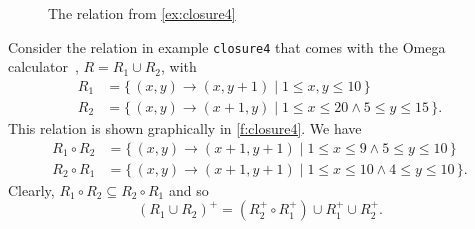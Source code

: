 \begin{figure}
\begin{center}
\end{center}
\caption{The relation from \autoref{ex:closure4}}
\label{f:closure4}
\end{figure}
\begin{example}
\label{ex:closure4}
Consider the relation in example {\tt closure4} that comes with
the Omega calculator~\parencite{Omega_calc}, $R = R_1 \cup R_2$,
with
$$
\begin{aligned}
R_1 & = \{\, (x,y) \to (x,y+1) \mid 1 \le x,y \le 10 \,\}
\\
R_2 & = \{\, (x,y) \to (x+1,y) \mid 1 \le x \le 20 \wedge 5 \le y \le 15 \,\}
.
\end{aligned}
$$
This relation is shown graphically in \autoref{f:closure4}.
We have
$$
\begin{aligned}
R_1 \circ R_2 &=
\{\, (x,y) \to (x+1,y+1) \mid 1 \le x \le 9 \wedge 5 \le y \le 10 \,\}
\\
R_2 \circ R_1 &=
\{\, (x,y) \to (x+1,y+1) \mid 1 \le x \le 10 \wedge 4 \le y \le 10 \,\}
.
\end{aligned}
$$
Clearly, $R_1 \circ R_2 \subseteq R_2 \circ R_1$ and so
$$
\left(
R_1 \cup R_2
\right)^+
=
\left(R_2^+ \circ R_1^+\right)
\cup R_1^+
\cup R_2^+
.
$$
\end{example}

